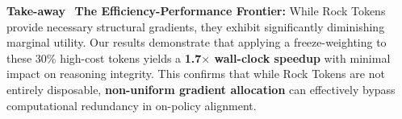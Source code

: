 \begin{takeaway}
\textcolor{tabblue}{\textbf{Take-away}}~
\textbf{The Efficiency-Performance Frontier:} While Rock Tokens provide necessary structural gradients, they exhibit significantly diminishing marginal utility. Our results demonstrate that applying a freeze-weighting to these 30\% high-cost tokens yields a \textbf{1.7$\times$ wall-clock speedup} with minimal impact on reasoning integrity. This confirms that while Rock Tokens are not entirely disposable, \textbf{non-uniform gradient allocation} can effectively bypass computational redundancy in on-policy alignment.
\end{takeaway}